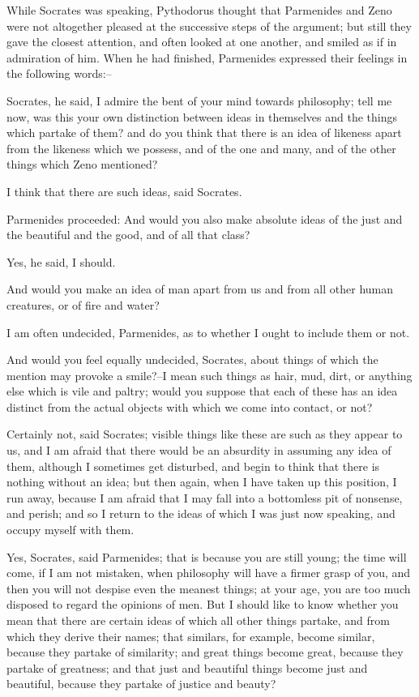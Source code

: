 While Socrates was speaking, Pythodorus thought that Parmenides and Zeno
were not altogether pleased at the successive steps of the argument; but
still they gave the closest attention, and often looked at one another,
and smiled as if in admiration of him. When he had finished, Parmenides
expressed their feelings in the following words:--

Socrates, he said, I admire the bent of your mind towards philosophy;
tell me now, was this your own distinction between ideas in themselves
and the things which partake of them? and do you think that there is an
idea of likeness apart from the likeness which we possess, and of the
one and many, and of the other things which Zeno mentioned?

I think that there are such ideas, said Socrates.

Parmenides proceeded: And would you also make absolute ideas of the just
and the beautiful and the good, and of all that class?

Yes, he said, I should.

And would you make an idea of man apart from us and from all other human
creatures, or of fire and water?

I am often undecided, Parmenides, as to whether I ought to include them
or not.

And would you feel equally undecided, Socrates, about things of which
the mention may provoke a smile?--I mean such things as hair, mud, dirt,
or anything else which is vile and paltry; would you suppose that each
of these has an idea distinct from the actual objects with which we come
into contact, or not?

Certainly not, said Socrates; visible things like these are such as
they appear to us, and I am afraid that there would be an absurdity in
assuming any idea of them, although I sometimes get disturbed, and begin
to think that there is nothing without an idea; but then again, when I
have taken up this position, I run away, because I am afraid that I may
fall into a bottomless pit of nonsense, and perish; and so I return to
the ideas of which I was just now speaking, and occupy myself with them.

Yes, Socrates, said Parmenides; that is because you are still young; the
time will come, if I am not mistaken, when philosophy will have a firmer
grasp of you, and then you will not despise even the meanest things; at
your age, you are too much disposed to regard the opinions of men. But
I should like to know whether you mean that there are certain ideas of
which all other things partake, and from which they derive their names;
that similars, for example, become similar, because they partake of
similarity; and great things become great, because they partake of
greatness; and that just and beautiful things become just and beautiful,
because they partake of justice and beauty?

